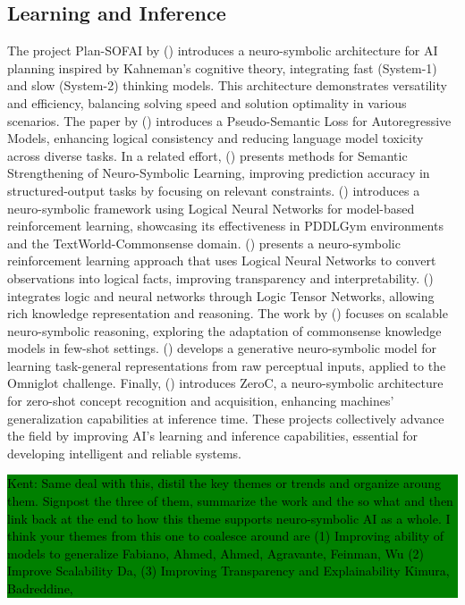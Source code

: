 \documentclass[hf]{ceurart}
\newcommand{\citeauthornum}[1]{\citeauthor{#1} (\citeyear{#1}) \cite{#1}}
\newcommand{\pinaforecomment}[4]{\colorbox{#1}{\textcolor{#4}{\parbox{.8\linewidth}{#2: #3}}}}
\newcommand{\osullikomment}[1]{\pinaforecomment{green}{Kent}{#1}{black}}
\begin{document}
\subsection{Learning and Inference}\label{subsec:disc_learn}
The project Plan-SOFAI by \citeauthornum{Fabiano2023} introduces a neuro-symbolic architecture for AI planning inspired by Kahneman's cognitive theory, integrating fast (System-1) and slow (System-2) thinking models. This architecture demonstrates versatility and efficiency, balancing solving speed and solution optimality in various scenarios. The paper by \citeauthornum{Ahmed2023} introduces a Pseudo-Semantic Loss for Autoregressive Models, enhancing logical consistency and reducing language model toxicity across diverse tasks. In a related effort, \citeauthornum{Ahmed2023a} presents methods for Semantic Strengthening of Neuro-Symbolic Learning, improving prediction accuracy in structured-output tasks by focusing on relevant constraints. \citeauthornum{Agravante2023} introduces a neuro-symbolic framework using Logical Neural Networks for model-based reinforcement learning, showcasing its effectiveness in PDDLGym environments and the TextWorld-Commonsense domain. \citeauthornum{Kimura2021} presents a neuro-symbolic reinforcement learning approach that uses Logical Neural Networks to convert observations into logical facts, improving transparency and interpretability. \citeauthornum{Badreddine2022} integrates logic and neural networks through Logic Tensor Networks, allowing rich knowledge representation and reasoning. The work by \citeauthornum{Da2021} focuses on scalable neuro-symbolic reasoning, exploring the adaptation of commonsense knowledge models in few-shot settings. \citeauthornum{Feinman2021} develops a generative neuro-symbolic model for learning task-general representations from raw perceptual inputs, applied to the Omniglot challenge. Finally, \citeauthornum{Wu2022a} introduces ZeroC, a neuro-symbolic architecture for zero-shot concept recognition and acquisition, enhancing machines' generalization capabilities at inference time. These projects collectively advance the field by improving AI's learning and inference capabilities, essential for developing intelligent and reliable systems.

\osullikomment{Same deal with this, distil the key themes or trends and organize aroung them. Signpost the three of them, summarize the work and the so what and then link back at the end to how this theme supports neuro-symbolic AI as a whole. I think your themes from this one to coalesce around are (1) Improving ability of models to generalize Fabiano, Ahmed, Ahmed, Agravante, Feinman, Wu (2) Improve Scalability Da, (3) Improving Transparency and Explainability Kimura, Badreddine, }
\end{document}
